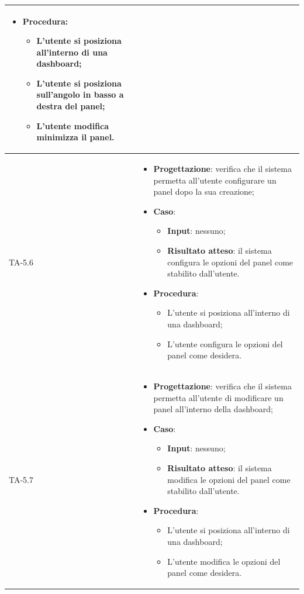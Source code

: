 \begin{longtable}{|C{2.5cm}|C{13cm}|}
\begin{itemize}
\begin{itemize}
	\end{itemize}
	\item \textbf{Procedura}:
	\begin{itemize}
		\item L'utente si posiziona all'interno di una dashboard;
		\item L'utente si posiziona sull'angolo in basso a destra del panel;
		\item L'utente modifica minimizza il panel.
	\end{itemize} 
\end{itemize} \\
\hline
{TA-5.6} &
\begin{itemize}
	\item \textbf{Progettazione}: verifica che il sistema permetta all'utente configurare un panel dopo la sua creazione;
	\item \textbf{Caso}: 
	\begin{itemize}
		\item \textbf{Input}: nessuno;
		\item \textbf{Risultato atteso}: il sistema configura le opzioni del panel come stabilito dall'utente.
	\end{itemize}
	\item \textbf{Procedura}:
	\begin{itemize}
		\item L'utente si posiziona all'interno di una dashboard;
		\item L'utente configura le opzioni del panel come desidera.
	\end{itemize} 
\end{itemize} \\
\hline
{TA-5.7} &
\begin{itemize}
	\item \textbf{Progettazione}: verifica che il sistema permetta all'utente di modificare un panel all'interno della dashboard;
	\item \textbf{Caso}: 
	\begin{itemize}
		\item \textbf{Input}: nessuno;
		\item \textbf{Risultato atteso}: il sistema modifica le opzioni del panel come stabilito dall'utente.
	\end{itemize}
	\item \textbf{Procedura}:
	\begin{itemize}
		\item L'utente si posiziona all'interno di una dashboard;
		\item L'utente modifica le opzioni del panel come desidera.

\end{itemize}
\end{itemize}
\end{longtable}
